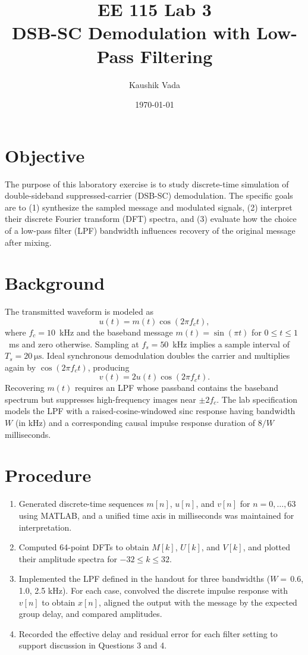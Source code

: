 \documentclass[11pt]{article}
\title{EE 115 Lab 3 \\ DSB-SC Demodulation with Low-Pass Filtering}
\author{Kaushik Vada}
\date{\today}
\begin{document}
\maketitle

\section{Objective}
The purpose of this laboratory exercise is to study discrete-time simulation of
double-sideband suppressed-carrier (DSB-SC) demodulation. The specific goals are
to (1) synthesize the sampled message and modulated signals, (2) interpret their
discrete Fourier transform (DFT) spectra, and (3) evaluate how the choice of a
low-pass filter (LPF) bandwidth influences recovery of the original message after
mixing.

\section{Background}
The transmitted waveform is modeled as
\begin{equation}
    u(t) = m(t) \cos\left(2\pi f_c t\right),
\end{equation}
where $f_c = 10$~kHz and the baseband message $m(t) = \sin(\pi t)$ for
$0 \le t \le 1$~ms and zero otherwise. Sampling at $f_s=50$~kHz implies a sample
interval of $T_s=\SI{20}{\micro\second}$. Ideal synchronous demodulation doubles the
carrier and multiplies again by $\cos(2\pi f_c t)$, producing
\begin{equation}
    v(t) = 2u(t)\cos(2\pi f_c t).
\end{equation}
Recovering $m(t)$ requires an LPF whose passband contains the baseband spectrum
but suppresses high-frequency images near $\pm 2f_c$. The lab specification
models the LPF with a raised-cosine-windowed sinc response having bandwidth $W$
(in kHz) and a corresponding causal impulse response duration of $8/W$
milliseconds.

\section{Procedure}
\begin{enumerate}[label=\textbf{Step \arabic*:}, leftmargin=*]
    \item Generated discrete-time sequences $m[n]$, $u[n]$, and $v[n]$ for
    $n=0,\ldots,63$ using MATLAB, and a unified time axis in milliseconds was
    maintained for interpretation.
    \item Computed 64-point DFTs to obtain $M[k]$, $U[k]$, and $V[k]$, and plotted
    their amplitude spectra for $-32 \le k \le 32$.
    \item Implemented the LPF defined in the handout for three bandwidths
    ($W=\,$0.6, 1.0, 2.5 kHz). For each case, convolved the discrete impulse
    response with $v[n]$ to obtain $x[n]$, aligned the output with the message by
    the expected group delay, and compared amplitudes.
    \item Recorded the effective delay and residual error for each filter setting
    to support discussion in Questions 3 and 4.
\end{enumerate}
\end{document}
